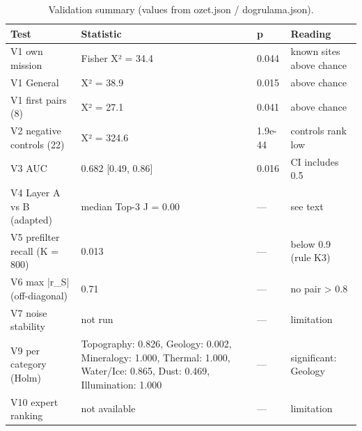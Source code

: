 \begin{table}[ht]
\centering\small
\caption{Validation summary (values from ozet.json / dogrulama.json).}
\label{tab:validation}
\begin{tabular}{llll}
\hline
Test & Statistic & p & Reading \\
\hline
V1 own mission & Fisher X² = 34.4 & 0.044 & known sites above chance \\
V1 General & X² = 38.9 & 0.015 & above chance \\
V1 first pairs (8) & X² = 27.1 & 0.041 & above chance \\
V2 negative controls (22) & X² = 324.6 & 1.9e-44 & controls rank low \\
V3 AUC & 0.682 [0.49, 0.86] & 0.016 & CI includes 0.5 \\
V4 Layer A vs B (adapted) & median Top-3 J = 0.00 & — & see text \\
V5 prefilter recall (K = 800) & 0.013 & — & below 0.9 (rule K3) \\
V6 max |r\_S| (off-diagonal) & 0.71 & — & no pair > 0.8 \\
V7 noise stability & not run & — & limitation \\
V9 per category (Holm) & Topography: 0.826, Geology: 0.002, Mineralogy: 1.000, Thermal: 1.000, Water/Ice: 0.865, Dust: 0.469, Illumination: 1.000 & — & significant: Geology \\
V10 expert ranking & not available & — & limitation \\
\hline
\end{tabular}
\end{table}